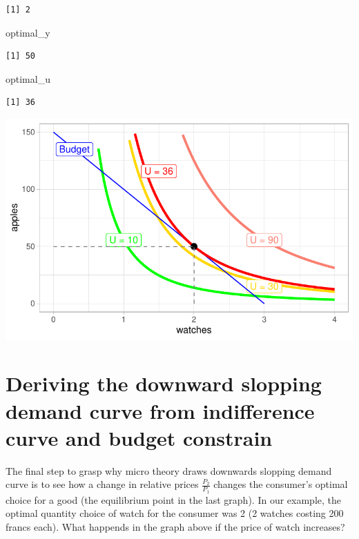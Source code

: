 \documentclass[
  letterpaper,
  DIV=11,
  numbers=noendperiod]{scrreprt}
\newenvironment{Shaded}{\begin{snugshade}}{\end{snugshade}}
\newcommand{\NormalTok}[1]{\textcolor[rgb]{0.00,0.23,0.31}{#1}}
\begin{document}
\begin{verbatim}
[1] 2
\end{verbatim}

\begin{Shaded}
\begin{Highlighting}[]
\NormalTok{optimal\_y}
\end{Highlighting}
\end{Shaded}

\begin{verbatim}
[1] 50
\end{verbatim}

\begin{Shaded}
\begin{Highlighting}[]
\NormalTok{optimal\_u}
\end{Highlighting}
\end{Shaded}

\begin{verbatim}
[1] 36
\end{verbatim}

\includegraphics{consumer-theory_files/figure-pdf/unnamed-chunk-14-1.pdf}

\hypertarget{deriving-the-downward-slopping-demand-curve-from-indifference-curve-and-budget-constrain}{%
\section{Deriving the downward slopping demand curve from indifference
curve and budget
constrain}\label{deriving-the-downward-slopping-demand-curve-from-indifference-curve-and-budget-constrain}}

The final step to grasp why micro theory draws downwards slopping demand
curve is to see how a change in relative prices \(\frac{P_2}{P_1}\)
changes the consumer's optimal choice for a good (the equilibrium point
in the last graph). In our example, the optimal quantity choice of watch
for the consumer was 2 (2 watches costing 200 francs each). What
happends in the graph above if the price of watch increases?
\end{document}
